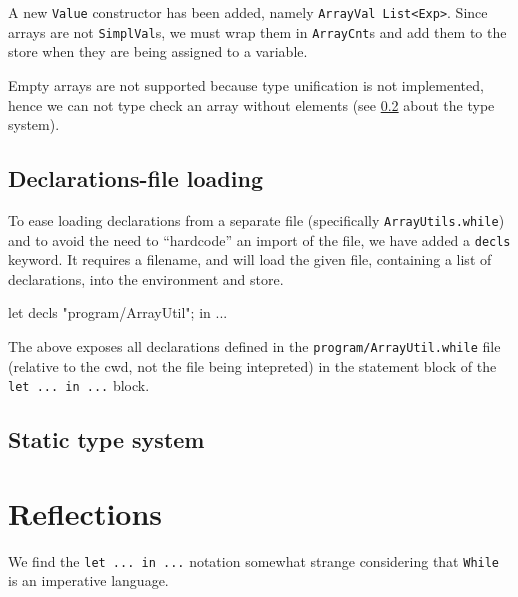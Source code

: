 \documentclass{article}
\begin{document}
A new {\tt Value} constructor has been added, namely {\tt ArrayVal List<Exp>}. Since arrays are not {\tt SimplVal}s, we must wrap them in {\tt ArrayCnt}s and add them to the store when they are being assigned to a variable.

Empty arrays are not supported because type unification is not implemented, hence we can not type check an array without elements (see \ref{sec:type} about the type system).

\subsection{Declarations-file loading}

To ease loading declarations from a separate file (specifically {\tt ArrayUtils.while}) and to avoid the need to ``hardcode'' an import of the file, we have added a {\tt decls} keyword. It requires a filename, and will load the given file, containing a list of declarations, into the environment and store.

\begin{fs}
let decls "program/ArrayUtil"; in ...
\end{fs}

The above exposes all declarations defined in the {\tt program/ArrayUtil.while} file (relative to the cwd, not the file being intepreted) in the statement block of the {\tt let ... in ...} block.

\subsection{Static type system}
\label{sec:type}


\section{Reflections}
We find the {\tt let ... in ...} notation somewhat strange considering that {\tt While} is an imperative language.
\end{document}
